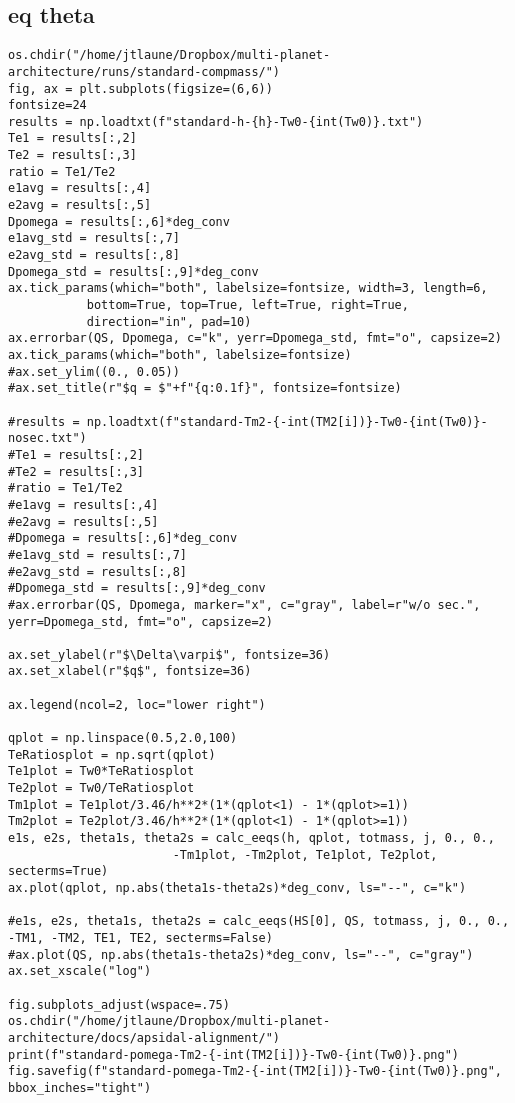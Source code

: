 \documentclass[11pt]{article}
\begin{document}
\subsection{eq theta}
\label{sec:orgd981332}
\begin{verbatim}
os.chdir("/home/jtlaune/Dropbox/multi-planet-architecture/runs/standard-compmass/")
fig, ax = plt.subplots(figsize=(6,6))
fontsize=24
results = np.loadtxt(f"standard-h-{h}-Tw0-{int(Tw0)}.txt")
Te1 = results[:,2]
Te2 = results[:,3]
ratio = Te1/Te2
e1avg = results[:,4]
e2avg = results[:,5]
Dpomega = results[:,6]*deg_conv
e1avg_std = results[:,7]
e2avg_std = results[:,8]
Dpomega_std = results[:,9]*deg_conv
ax.tick_params(which="both", labelsize=fontsize, width=3, length=6,
	       bottom=True, top=True, left=True, right=True,
	       direction="in", pad=10)
ax.errorbar(QS, Dpomega, c="k", yerr=Dpomega_std, fmt="o", capsize=2)
ax.tick_params(which="both", labelsize=fontsize)
#ax.set_ylim((0., 0.05))
#ax.set_title(r"$q = $"+f"{q:0.1f}", fontsize=fontsize)

#results = np.loadtxt(f"standard-Tm2-{-int(TM2[i])}-Tw0-{int(Tw0)}-nosec.txt")
#Te1 = results[:,2]
#Te2 = results[:,3]
#ratio = Te1/Te2
#e1avg = results[:,4]
#e2avg = results[:,5]
#Dpomega = results[:,6]*deg_conv
#e1avg_std = results[:,7]
#e2avg_std = results[:,8]
#Dpomega_std = results[:,9]*deg_conv
#ax.errorbar(QS, Dpomega, marker="x", c="gray", label=r"w/o sec.", yerr=Dpomega_std, fmt="o", capsize=2)

ax.set_ylabel(r"$\Delta\varpi$", fontsize=36)
ax.set_xlabel(r"$q$", fontsize=36)

ax.legend(ncol=2, loc="lower right")

qplot = np.linspace(0.5,2.0,100)
TeRatiosplot = np.sqrt(qplot)
Te1plot = Tw0*TeRatiosplot
Te2plot = Tw0/TeRatiosplot
Tm1plot = Te1plot/3.46/h**2*(1*(qplot<1) - 1*(qplot>=1))
Tm2plot = Te2plot/3.46/h**2*(1*(qplot<1) - 1*(qplot>=1))
e1s, e2s, theta1s, theta2s = calc_eeqs(h, qplot, totmass, j, 0., 0.,
				       -Tm1plot, -Tm2plot, Te1plot, Te2plot, secterms=True)
ax.plot(qplot, np.abs(theta1s-theta2s)*deg_conv, ls="--", c="k")

#e1s, e2s, theta1s, theta2s = calc_eeqs(HS[0], QS, totmass, j, 0., 0., -TM1, -TM2, TE1, TE2, secterms=False)
#ax.plot(QS, np.abs(theta1s-theta2s)*deg_conv, ls="--", c="gray")
ax.set_xscale("log")

fig.subplots_adjust(wspace=.75)
os.chdir("/home/jtlaune/Dropbox/multi-planet-architecture/docs/apsidal-alignment/")
print(f"standard-pomega-Tm2-{-int(TM2[i])}-Tw0-{int(Tw0)}.png")
fig.savefig(f"standard-pomega-Tm2-{-int(TM2[i])}-Tw0-{int(Tw0)}.png", bbox_inches="tight")
\end{verbatim}
\end{document}
